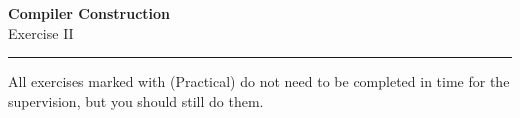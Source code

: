 \documentclass[10pt,a4paper]{exam} %
\begin{document}
\newcommand{\course}{Compiler Construction}
\newcommand{\week}{II}
\newcommand{\topics}{}

\everymath{\color{campurpledark}}
\everydisplay{\color{campurpledark}}




\marksnotpoints
\pointsdroppedatright
\marksnotpoints
\marginpointname{ \points}

\begin{center}
\LARGE {\textbf{\color{campurpledark} \course} }\\[-0.2cm]
\Large \color{campurpledark} Exercise \week\\
\end{center}

{\color{campurple}\hrule}

\newcommand{\terminal}[1]{\texttt{\color{campurple}#1}}
\newcommand{\bl}[1]{{\color{black}#1}}

\vspace{0.5cm}

All exercises marked with (Practical) do not need to be completed in time for the supervision, but you should still do them.
\end{document}
